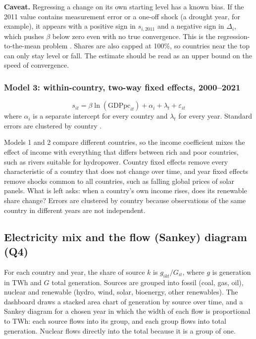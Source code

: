\documentclass[11pt,a4paper]{article}
\begin{document}
\noindent\textbf{Caveat.} Regressing a change on its own starting level has a known bias. If the 2011 value contains measurement error or a one-off shock (a drought year, for example), it appears with a positive sign in $s_{i,2011}$ and a negative sign in $\Delta_i$, which pushes $\beta$ below zero even with no true convergence. This is the regression-to-the-mean problem \citep{friedman1992}. Shares are also capped at 100\%, so countries near the top can only stay level or fall. The estimate should be read as an upper bound on the speed of convergence.

\subsubsection{Model 3: within-country, two-way fixed effects, 2000--2021}
\begin{equation}
s_{it} = \beta \ln(\text{GDPpc}_{it}) + \alpha_i + \lambda_t + \varepsilon_{it}
\end{equation}
where $\alpha_i$ is a separate intercept for every country and $\lambda_t$ for every year. Standard errors are clustered by country \citep{cameron2015}.

\begin{why}
Models 1 and 2 compare different countries, so the income coefficient mixes the effect of income with everything that differs between rich and poor countries, such as rivers suitable for hydropower. Country fixed effects remove every characteristic of a country that does not change over time, and year fixed effects remove shocks common to all countries, such as falling global prices of solar panels. What is left asks: when a country's own income rises, does its renewable share change? Errors are clustered by country because observations of the same country in different years are not independent.
\end{why}

\subsection{Electricity mix and the flow (Sankey) diagram (Q4)}
For each country and year, the share of source $k$ is $g_{ikt} / G_{it}$, where $g$ is generation in TWh and $G$ total generation. Sources are grouped into fossil (coal, gas, oil), nuclear and renewable (hydro, wind, solar, bioenergy, other renewables). The dashboard draws a stacked area chart of generation by source over time, and a Sankey diagram for a chosen year in which the width of each flow is proportional to TWh: each source flows into its group, and each group flows into total generation. Nuclear flows directly into the total because it is a group of one.
\end{document}
